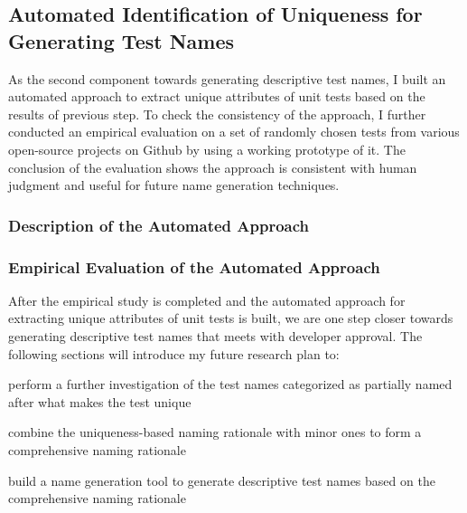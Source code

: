 \subsection{Automated Identification of Uniqueness for Generating Test Names}
\label{sec:uniquness-approach}

As the second component towards generating descriptive test names, I built an automated approach to extract unique attributes of unit tests based on the results of previous step.
%
To check the consistency of the approach, I further conducted an empirical evaluation on a set of randomly chosen tests from various open-source projects on Github by using a working prototype of it.
%
The conclusion of the evaluation shows the approach is consistent with human judgment and useful for future name generation techniques.


\subsubsection{Description of the Automated Approach}

\subsubsection{Empirical Evaluation of the Automated Approach}
\label{sec:emp-eval-attributes}


After the empirical study is completed and the automated approach for extracting unique attributes of unit tests is built, we are one step closer towards generating descriptive test names that meets with developer approval.
%
The following sections will introduce my future research plan to:
\begin{enumerate*}
    \item perform a further investigation of the test names categorized as partially named after what makes the test unique
    \item combine the uniqueness-based naming rationale with minor ones to form a comprehensive naming rationale
    \item build a name generation tool to generate descriptive test names based on the comprehensive naming rationale 
\end{enumerate*}

